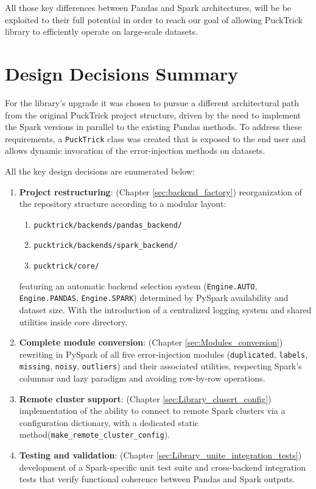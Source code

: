 \documentclass[../main.tex]{subfiles}
\begin{document}
All those key differences between Pandas and Spark architectures, will be be exploited to their full potential in order to reach our goal of allowing PuckTrick library to efficiently operate on large-scale datasets.


\newpage
\section{Design Decisions Summary}
\label{sec:Design_Decisions}
For the library's upgrade it was chosen to pursue a different architectural path from the original PuckTrick project structure, driven by the need to implement the Spark versions in  parallel to the existing Pandas methods. To address these requirements, a \texttt{PuckTrick} class was created that is exposed to the end user and allows dynamic invocation of the error-injection methods on datasets.

All the key design decisions are enumerated below:

\begin{enumerate}
    \item \textbf{Project restructuring}: (Chapter \ref{sec:backend_factory})       reorganization of the repository structure according to a modular layout:
          \begin{enumerate}
              \item \texttt{pucktrick/backends/pandas\_backend/}
              \item \texttt{pucktrick/backends/spark\_backend/}
              \item \texttt{pucktrick/core/}
          \end{enumerate}
          featuring an automatic backend selection system (\texttt{Engine.AUTO}, \texttt{Engine.PANDAS}, \texttt{Engine.SPARK}) determined by PySpark availability and dataset size. 
          With the introduction of a centralized logging system and shared utilities inside core directory.

    \item \textbf{Complete module conversion}: (Chapter \ref{sec:Modules_conversion}) rewriting in PySpark of all five error-injection modules (\texttt{duplicated}, \texttt{labels}, \texttt{missing}, \texttt{noisy}, \texttt{outliers}) and their associated utilities, respecting Spark's columnar and lazy paradigm and avoiding row-by-row operations.

    \item \textbf{Remote cluster support}: (Chapter \ref{sec:Library_clusert_config}) implementation of the ability to connect to remote Spark clusters via a configuration dictionary, with a dedicated static method\newline (\texttt{make\_remote\_cluster\_config}).

    \item \textbf{Testing and validation}: (Chapter \ref{sec:Library_unite_integration_tests}) development of a Spark-specific unit test suite and cross-backend integration tests that verify functional coherence between Pandas and Spark outputs.
\end{enumerate}
\end{document}
